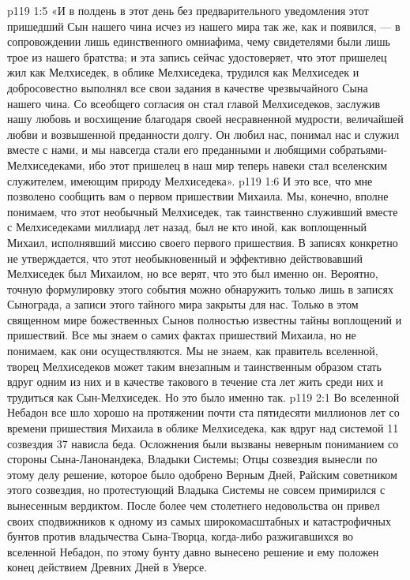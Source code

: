 \vs p119 1:5 «И в полдень в этот день без предварительного уведомления этот пришедший Сын нашего чина исчез из нашего мира так же, как и появился, --- в сопровождении лишь единственного омниафима, чему свидетелями были лишь трое из нашего братства; и эта запись сейчас удостоверяет, что этот пришелец жил как Мелхиседек, в облике Мелхиседека, трудился как Мелхиседек и добросовестно выполнял все свои задания в качестве чрезвычайного Сына нашего чина. Со всеобщего согласия он стал главой Мелхиседеков, заслужив нашу любовь и восхищение благодаря своей несравненной мудрости, величайшей любви и возвышенной преданности долгу. Он любил нас, понимал нас и служил вместе с нами, и мы навсегда стали его преданными и любящими собратьями\hyp{}Мелхиседеками, ибо этот пришелец в наш мир теперь навеки стал вселенским служителем, имеющим природу Мелхиседека».
\vs p119 1:6 И это все, что мне позволено сообщить вам о первом пришествии Михаила. Мы, конечно, вполне понимаем, что этот необычный Мелхиседек, так таинственно служивший вместе с Мелхиседеками миллиард лет назад, был не кто иной, как воплощенный Михаил, исполнявший миссию своего первого пришествия. В записях конкретно не утверждается, что этот необыкновенный и эффективно действовавший Мелхиседек был Михаилом, но все верят, что это был именно он. Вероятно, точную формулировку этого события можно обнаружить только лишь в записях Сынограда, а записи этого тайного мира закрыты для нас. Только в этом священном мире божественных Сынов полностью известны тайны воплощений и пришествий. Все мы знаем о самих фактах пришествий Михаила, но не понимаем, как они осуществляются. Мы не знаем, как правитель вселенной, творец Мелхиседеков может таким внезапным и таинственным образом стать вдруг одним из них и в качестве такового в течение ста лет жить среди них и трудиться как Сын\hyp{}Мелхиседек. Но это было именно так.
\vs p119 2:1 Во вселенной Небадон все шло хорошо на протяжении почти ста пятидесяти миллионов лет со времени пришествия Михаила в облике Мелхиседека, как вдруг над системой 11 созвездия 37 нависла беда. Осложнения были вызваны неверным пониманием со стороны Сына\hyp{}Ланонандека, Владыки Системы; Отцы созвездия вынесли по этому делу решение, которое было одобрено Верным Дней, Райским советником этого созвездия, но протестующий Владыка Системы не совсем примирился с вынесенным вердиктом. После более чем столетнего недовольства он привел своих сподвижников к одному из самых широкомасштабных и катастрофичных бунтов против владычества Сына\hyp{}Творца, когда\hyp{}либо разжигавшихся во вселенной Небадон, по этому бунту давно вынесено решение и ему положен конец действием Древних Дней в Уверсе.
